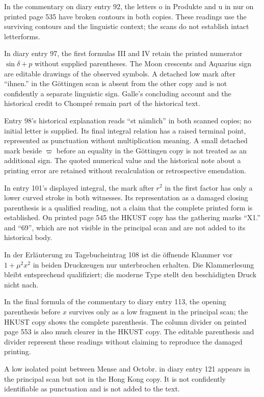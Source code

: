 In the commentary on diary entry 92, the letters o in Produkte and u in nur on printed page 535 have broken contours in both copies. These readings use the surviving contours and the linguistic context; the scans do not establish intact letterforms.

In diary entry 97, the first formulas III and IV retain the printed numerator \(\sin\delta+p\) without supplied parentheses. The Moon crescents and Aquarius sign are editable drawings of the observed symbols. A detached low mark after “ihnen.” in the Göttingen scan is absent from the other copy and is not confidently a separate linguistic sign. Galle’s concluding account and the historical credit to Chompré remain part of the historical text.

Entry 98’s historical explanation reads “st nämlich” in both scanned copies; no initial letter is supplied. Its final integral relation has a raised terminal point, represented as punctuation without multiplication meaning. A small detached mark beside \(\varpi\) before an equality in the Göttingen copy is not treated as an additional sign. The quoted numerical value and the historical note about a printing error are retained without recalculation or retrospective emendation.

In entry 101’s displayed integral, the mark after \(r^2\) in the first factor has only a lower curved stroke in both witnesses. Its representation as a damaged closing parenthesis is a qualified reading, not a claim that the complete printed form is established. On printed page 545 the HKUST copy has the gathering marks “X1.” and “69”, which are not visible in the principal scan and are not added to its historical body.

In der Erläuterung zu Tagebucheintrag 108 ist die öffnende Klammer vor \(1+\mu^2x^2\) in beiden Druckzeugen nur unterbrochen erhalten. Die Klammerlesung bleibt entsprechend qualifiziert; die moderne Type stellt den beschädigten Druck nicht nach.

In the final formula of the commentary to diary entry 113, the opening parenthesis before \(x\) survives only as a low fragment in the principal scan; the HKUST copy shows the complete parenthesis. The column divider on printed page 553 is also much clearer in the HKUST copy. The editable parenthesis and divider represent these readings without claiming to reproduce the damaged printing.

A low isolated point between Mense and Octobr. in diary entry 121 appears in the principal scan but not in the Hong Kong copy. It is not confidently identifiable as punctuation and is not added to the text.

